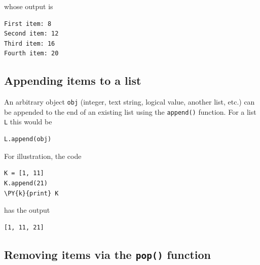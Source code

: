 \noindent
whose output is\\

\begin{ybox}
\begin{Verbatim}[commandchars=\\\{\}]
First item: 8
Second item: 12
Third item: 16
Fourth item: 20
\end{Verbatim}
\end{ybox}
\vspace{6mm}

\subsection[\ \ Appending items to a list]{Appending items to a list}

\noindent
An arbitrary object {\tt obj} (integer, text string, logical value, another list, etc.) can be appended 
to the end of an existing list using the {\tt append()} function. For a list {\tt L} this would be\\

\begin{bbox}
\begin{Verbatim}[commandchars=\\\{\}]
L.append(obj)
\end{Verbatim}
\end{bbox}
\vspace{6mm}

\noindent
For illustration, the code\\

\begin{bbox}
\begin{Verbatim}[commandchars=\\\{\}]
K = [1, 11]
K.append(21)
\PY{k}{print} K
\end{Verbatim}
\end{bbox}
\vspace{6mm}

\noindent
has the output\\

\begin{ybox}
\begin{Verbatim}[commandchars=\\\{\}]
[1, 11, 21]
\end{Verbatim}
\end{ybox}
\vspace{6mm}

\subsection[\ \ Removing items via the {\tt pop()} function]{Removing items via the {\tt pop()} function}

